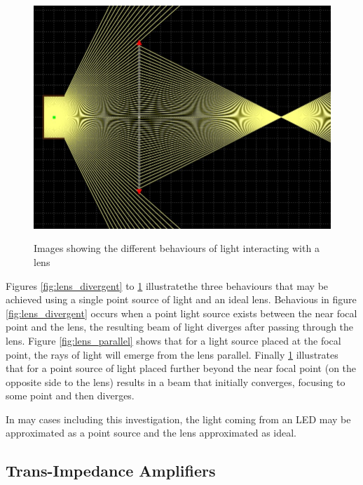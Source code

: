 \begin{figure}[H]
\begin{minipage}{.3\textwidth}
		\centering
		\includegraphics[width=.9\linewidth]{figures/litreview/lens_focus_beam.JPG}
		\label{fig:lens_convergent}
	\end{minipage}
	\caption*{Images showing the different behaviours of light interacting with a lens}
\end{figure}

Figures \ref{fig:lens_divergent} to \ref{fig:lens_convergent} illustrate\footnotemark the three behaviours that may be achieved using a single point source of light and an ideal lens. Behavious in figure \ref{fig:lens_divergent} occurs when a point light source exists between the near focal point and the lens, the resulting beam of light diverges after passing through the lens. Figure \ref{fig:lens_parallel} shows that for a light source placed at the focal point, the rays of light will emerge from the lens parallel. Finally \ref{fig:lens_convergent} illustrates that for a point source of light placed further beyond the near focal point (on the opposite side to the lens) results in a beam that initially converges, focusing to some point and then diverges.

In may cases including this investigation, the light coming from an LED may be approximated as a point source and the lens approximated as ideal.



\subsection{Trans-Impedance Amplifiers} %

